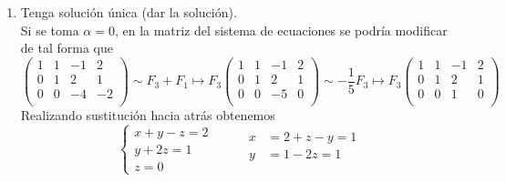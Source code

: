 \documentclass{article}
\begin{document}
\begin{enumerate}
\begin{enumerate}[label=\listAlph]
            \item Tenga solución única (dar la solución). \\
                Si se toma \(\alpha = 0\), en la matriz del sistema de ecuaciones se podría modificar de tal forma que
                \[
                    \left(
                    \begin{array}{ccc|c}
                        1 & 1 & -1 & 2 \\
                        0 & 1 & 2 & 1 \\
                        0 & 0 & -4 & -2 \\
                    \end{array}
                    \right)
                    \sim
                    F_3 + F_1 \mapsto F_3
                    \left(
                    \begin{array}{ccc|c}
                        1 & 1 & -1 & 2 \\
                        0 & 1 & 2 & 1 \\
                        0 & 0 & -5 & 0 \\
                    \end{array}
                    \right)
                    \sim
                    -\frac{1}{5}F_3 \mapsto F_3
                    \left(
                    \begin{array}{ccc|c}
                        1 & 1 & -1 & 2 \\
                        0 & 1 & 2 & 1 \\
                        0 & 0 & 1 & 0 \\
                    \end{array}
                    \right)
                \]
                Realizando sustitución hacia atrás obtenemos
                \[
                    \left\{
                        \begin{aligned}
                            x + y - z = 2 \\
                            y + 2z = 1 \\
                            z = 0
                        \end{aligned}
                    \right.
                    \hspace{1cm}
                    \begin{aligned}
                        x &= 2 + z - y = 1 \\
                        y &= 1 -2z = 1 \\

\end{aligned}\]
\end{enumerate}
\end{enumerate}
\end{document}
